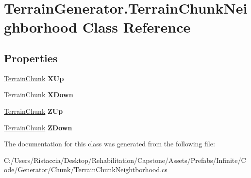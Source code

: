 \hypertarget{class_terrain_generator_1_1_terrain_chunk_neighborhood}{}\section{Terrain\+Generator.\+Terrain\+Chunk\+Neighborhood Class Reference}
\label{class_terrain_generator_1_1_terrain_chunk_neighborhood}
\subsection*{Properties}
\begin{DoxyCompactItemize}
\item 
\mbox{\label{class_terrain_generator_1_1_terrain_chunk_neighborhood_aa0cb7b9db7ba420331c3d88427f3a679}} 
\hyperlink{class_terrain_generator_1_1_terrain_chunk}{Terrain\+Chunk} {\bfseries X\+Up}
\item 
\mbox{\label{class_terrain_generator_1_1_terrain_chunk_neighborhood_a5eda0caad45de91188fe00df9760ad4c}} 
\hyperlink{class_terrain_generator_1_1_terrain_chunk}{Terrain\+Chunk} {\bfseries X\+Down}
\item 
\mbox{\label{class_terrain_generator_1_1_terrain_chunk_neighborhood_a6607b30102dcd53810c453374061b64b}} 
\hyperlink{class_terrain_generator_1_1_terrain_chunk}{Terrain\+Chunk} {\bfseries Z\+Up}
\item 
\mbox{\label{class_terrain_generator_1_1_terrain_chunk_neighborhood_ad3fccb896935ce34d7334b78a2580509}} 
\hyperlink{class_terrain_generator_1_1_terrain_chunk}{Terrain\+Chunk} {\bfseries Z\+Down}
\end{DoxyCompactItemize}


The documentation for this class was generated from the following file\+:\begin{DoxyCompactItemize}
\item 
C\+:/\+Users/\+Ristaccia/\+Desktop/\+Rehabilitation/\+Capstone/\+Assets/\+Prefabs/\+Infinite/\+Code/\+Generator/\+Chunk/Terrain\+Chunk\+Neightborhood.\+cs\end{DoxyCompactItemize}

